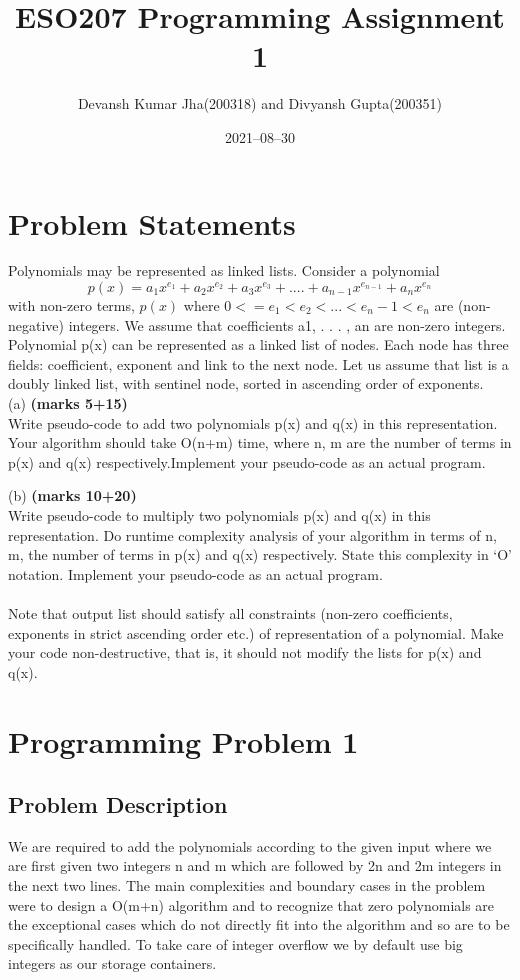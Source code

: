 \documentclass[20pt]{article}
\title{ESO207 Programming Assignment 1}
\author{Devansh Kumar Jha(200318) and Divyansh Gupta(200351)}
\date{2021–08–30}
\begin{document}
\maketitle

\section{Problem Statements}

Polynomials may be represented as linked lists.  Consider a polynomial 
\begin{equation*}
p(x) = a_1x^{e_1} + a_2x^{e_2} + a_3x^{e_3} + . . . . + a_{n-1}x^{e_{n-1}} + a_nx^{e_n}
\end{equation*}
with non-zero terms, $ p(x) $ 
where $ 0 <= e_1< e_2< . . . < e_n-1 < e_n $ are (non-negative) integers.  We assume that coefficients  {a1, . . . , an} are non-zero integers. Polynomial {p(x)} can be represented as a linked list of nodes.  Each node has three fields:  coefficient, exponent and link to the next node.  Let us assume that list is a doubly linked list, with sentinel node, sorted in ascending order of exponents.
\\

(a) \textbf{(marks 5+15)} \\ 
Write pseudo-code to add two polynomials {p(x) and q(x)} in this representation.  Your algorithm should take {O(n+m)} time, where {n, m} are the number of terms in {p(x) and q(x)} respectively.Implement your pseudo-code as an actual program.

(b) \textbf{(marks 10+20)} \\
Write  pseudo-code  to  multiply  two  polynomials {p(x)  and q(x)}  in  this representation.   Do  runtime  complexity  analysis  of  your  algorithm  in  terms  of {n, m},  the number of terms in {p(x) and q(x)} respectively.  State this complexity in ‘O’ notation. Implement your pseudo-code as an actual program.
\\ \\
Note  that  output  list  should  satisfy  all  constraints  (non-zero  coefficients,  exponents  in  strict ascending order etc.)  of representation of a polynomial.  Make your code non-destructive, that is, it should not modify the lists for {p(x) and q(x)}.

\newpage
\section{Programming Problem 1}

\subsection{Problem Description}
We are required to add the polynomials according to the given input where we are first given two integers n and m which are followed by {2n} and {2m} integers in the next two lines.
The main complexities and boundary cases in the problem were to design a {O(m+n)} algorithm and to recognize that zero polynomials are the exceptional cases which do not directly fit into the algorithm and so are to be specifically handled. To take care of integer overflow we by default use big integers as our storage containers.
\end{document}
